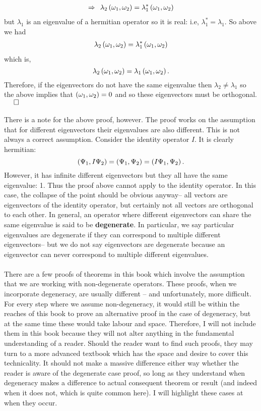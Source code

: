 \begin{enumerate}
$$\begin{aligned}
    \Rightarrow\:\: \lambda_{2}\left(\omega_{1},\omega_{2}\right)&=\lambda_{1}^{\ast}\left(\omega_{1},\omega_{2}\right)\\
    \end{aligned}
    $$
    but $\lambda_{1}$ is an eigenvalue of a hermitian operator so it is real: i.e, $\lambda_{1}^{\ast}=\lambda_{1}$. So above we had 
    $$
    \begin{aligned}
    \lambda_{2}\left(\omega_{1},\omega_{2}\right)&=\lambda_{1}^{\ast}\left(\omega_{1},\omega_{2}\right)\\
    \end{aligned}
    $$
    which is,
    $$
    \lambda_{2}\left(\omega_{1},\omega_{2}\right)=\lambda_{1}\left(\omega_{1},\omega_{2}\right).\\
    $$
    Therefore, if the eigenvectors do not have the same eigenvalue then $\lambda_{2}\neq\lambda_{1}$ so the above implies that $\left(\omega_{1},\omega_{2}\right)=0$ and so these eigenvectors must be orthogonal. $\:\:\:\:\:\:\square$
    \\\\
    There is a note for the above proof, however. The proof works on the assumption that for different eigenvectors their eigenvalues are also different. This is not always a correct assumption. Consider the identity operator $I$. It is clearly hermitian:
    $$
    \left(\Psi_{1},I\Psi_{2}\right)=\left(\Psi_{1},\Psi_{2}\right)=\left(I\Psi_{1},\Psi_{2}\right).
    $$
    However, it has infinite different eigenvectors but they all have the same eigenvalue: 1. Thus the proof above cannot apply to the identity operator. In this case, the collapse of the point should be obvious anyway-- all vectors are eigenvectors of the identity operator, but certainly not all vectors are orthogonal to each other. In general, an operator where different eigenvectors can share the same eigenvalue is said to be \textbf{degenerate}. In particular, we say particular eigenvalues are degenerate if they can correspond to multiple different eigenvectors-- but we do not say eigenvectors are degenerate because an eigenvector can never correspond to multiple different eigenvalues. 
    \\\\
    There are a few proofs of theorems in this book which involve the assumption that we are working with non-degenerate operators. These proofs, when we incorporate degeneracy, are usually different -- and unfortunately, more difficult. For every step where we assume non-degeneracy, it would still be within the reaches of this book to prove an alternative proof in the case of degeneracy, but at the same time these would take labour and space. Therefore, I will not include them in this book because they will not alter anything in the fundamental understanding of a reader. Should the reader want to find such proofs, they may turn to a more advanced textbook which has the space and desire to cover this technicality. It should not make a massive difference either way whether the reader is aware of the degenerate case proof, so long as they understand when degeneracy makes a difference to actual consequent theorem or result (and indeed when it does not, which is quite common here). I will highlight these cases at when they occur.

\end{enumerate}
